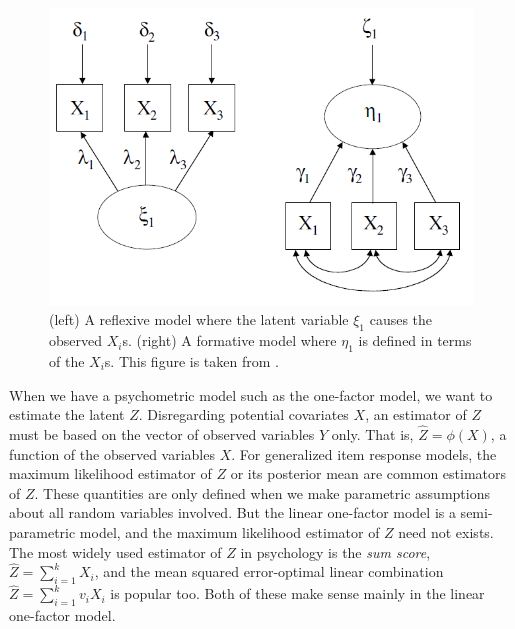 \begin{figure}
\noindent \begin{centering}
\includegraphics[scale=0.5]{chunks/borsboom}
\par\end{centering}

\caption{\label{fig:dag}(left) A reflexive model where the latent variable $\xi_{1}$ causes the observed $X_{i}$s. (right) A formative model where $\eta_{1}$ is defined in terms of the $X_{i}$s. This figure is taken from \textcite[p. 61]{Borsboom2005-iq}.}
\end{figure}

When we have a psychometric model such as the one-factor model, we want to estimate the latent $Z$. Disregarding potential covariates $X$, an estimator of $Z$ must be based on the vector of observed variables $Y$ only. That is, $\hat{Z}=\phi(X)$, a function of the observed variables $X$. For generalized item response models, the maximum likelihood estimator of $Z$ or its posterior mean are common estimators of $Z$. These quantities are only defined when we make parametric assumptions about all random variables involved. But the linear one-factor model is a semi-parametric model, and the maximum likelihood estimator of $Z$ need not exists. The most widely used estimator of $Z$ in psychology is the \emph{sum
score}, $\hat{Z}=\sum_{i=1}^{k}X_{i}$, and the mean squared error-optimal linear combination $\hat{Z}=\sum_{i=1}^{k}v_{i}X_{i}$ is popular too. Both of these make sense mainly in the linear one-factor model. 

